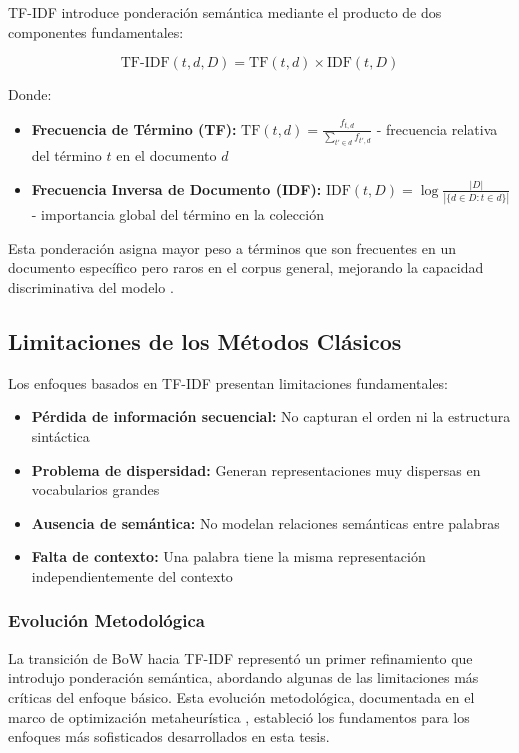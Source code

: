 TF-IDF introduce ponderación semántica mediante el producto de dos componentes fundamentales:

\begin{equation}
\text{TF-IDF}(t,d,D) = \text{TF}(t,d) \times \text{IDF}(t,D)
\end{equation}

Donde:
\begin{itemize}
    \item \textbf{Frecuencia de Término (TF):} $\text{TF}(t,d) = \frac{f_{t,d}}{\sum_{t' \in d} f_{t',d}}$ - frecuencia relativa del término $t$ en el documento $d$
    \item \textbf{Frecuencia Inversa de Documento (IDF):} $\text{IDF}(t,D) = \log\frac{|D|}{|\{d \in D : t \in d\}|}$ - importancia global del término en la colección
\end{itemize}

Esta ponderación asigna mayor peso a términos que son frecuentes en un documento específico pero raros en el corpus general, mejorando la capacidad discriminativa del modelo \cite{thota2018fake}.

\subsection{Limitaciones de los Métodos Clásicos}

Los enfoques basados en TF-IDF presentan limitaciones fundamentales:
\begin{itemize}
    \item \textbf{Pérdida de información secuencial:} No capturan el orden ni la estructura sintáctica
    \item \textbf{Problema de dispersidad:} Generan representaciones muy dispersas en vocabularios grandes
    \item \textbf{Ausencia de semántica:} No modelan relaciones semánticas entre palabras
    \item \textbf{Falta de contexto:} Una palabra tiene la misma representación independientemente del contexto
\end{itemize}

\subsubsection{Evolución Metodológica}

La transición de BoW hacia TF-IDF representó un primer refinamiento que introdujo ponderación semántica, abordando algunas de las limitaciones más críticas del enfoque básico. Esta evolución metodológica, documentada en el marco de optimización metaheurística \cite{hurtado2024calibracion}, estableció los fundamentos para los enfoques más sofisticados desarrollados en esta tesis.

